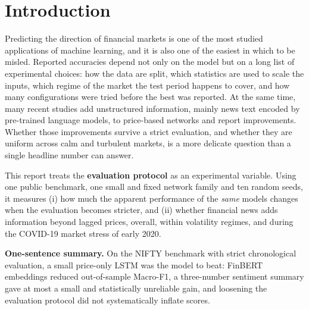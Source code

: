 \section{Introduction}
Predicting the direction of financial markets is one of the most studied applications of machine learning, and it is also one of the easiest in which to be misled. Reported accuracies depend not only on the model but on a long list of experimental choices: how the data are split, which statistics are used to scale the inputs, which regime of the market the test period happens to cover, and how many configurations were tried before the best was reported. At the same time, many recent studies add unstructured information, mainly news text encoded by pre-trained language models, to price-based networks and report improvements. Whether those improvements survive a strict evaluation, and whether they are uniform across calm and turbulent markets, is a more delicate question than a single headline number can answer.

This report treats the \textbf{evaluation protocol} as an experimental variable. Using one public benchmark, one small and fixed network family and ten random seeds, it measures (i) how much the apparent performance of the \emph{same} models changes when the evaluation becomes stricter, and (ii) whether financial news adds information beyond lagged prices, overall, within volatility regimes, and during the COVID-19 market stress of early 2020.

\begin{defbox}
\textbf{One-sentence summary.} On the NIFTY benchmark with strict chronological evaluation, a small price-only LSTM was the model to beat: FinBERT embeddings reduced out-of-sample Macro-F1, a three-number sentiment summary gave at most a small and statistically unreliable gain, and loosening the evaluation protocol did not systematically inflate scores.
\end{defbox}

